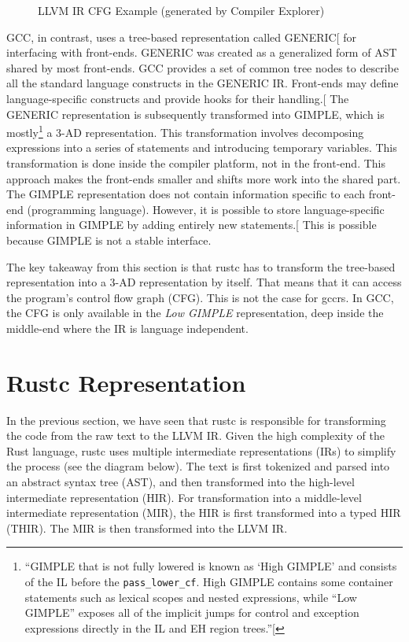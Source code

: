 \documentclass[
  11pt,
  twoside]{report}
\begin{document}
\begin{figure}
\centering

\caption{LLVM IR CFG Example (generated by Compiler Explorer)}
\end{figure}

GCC, in contrast, uses a tree-based representation called
GENERIC{[}\citeproc{ref-gccint}{12, p.~175}{]} for interfacing with
front-ends. GENERIC was created as a generalized form of AST shared by
most front-ends. GCC provides a set of common tree nodes to describe all
the standard language constructs in the GENERIC IR. Front-ends may
define language-specific constructs and provide hooks for their
handling.{[}\citeproc{ref-gccint}{12, p.~212}{]} The GENERIC
representation is subsequently transformed into GIMPLE, which is
mostly\footnote{``GIMPLE that is not fully lowered is known as `High
  GIMPLE' and consists of the IL before the \texttt{pass\_lower\_cf}.
  High GIMPLE contains some container statements such as lexical scopes
  and nested expressions, while ``Low GIMPLE'' exposes all of the
  implicit jumps for control and exception expressions directly in the
  IL and EH region trees.''{[}\citeproc{ref-gccint}{12, p.~225}{]}} a
3-AD representation. This transformation involves decomposing
expressions into a series of statements and introducing temporary
variables. This transformation is done inside the compiler platform, not
in the front-end. This approach makes the front-ends smaller and shifts
more work into the shared part. The GIMPLE representation does not
contain information specific to each front-end (programming language).
However, it is possible to store language-specific information in GIMPLE
by adding entirely new statements.{[}\citeproc{ref-gccint}{12,
p.~262}{]} This is possible because GIMPLE is not a stable interface.

The key takeaway from this section is that rustc has to transform the
tree-based representation into a 3-AD representation by itself. That
means that it can access the program's control flow graph (CFG). This is
not the case for gccrs. In GCC, the CFG is only available in the
\emph{Low GIMPLE} representation, deep inside the middle-end where the
IR is language independent.

\section{Rustc Representation}\label{sec:rustc-representation}

In the previous section, we have seen that rustc is responsible for
transforming the code from the raw text to the LLVM IR. Given the high
complexity of the Rust language, rustc uses multiple intermediate
representations (IRs) to simplify the process (see the diagram below).
The text is first tokenized and parsed into an abstract syntax tree
(AST), and then transformed into the high-level intermediate
representation (HIR). For transformation into a middle-level
intermediate representation (MIR), the HIR is first transformed into a
typed HIR (THIR). The MIR is then transformed into the LLVM IR.
\end{document}
